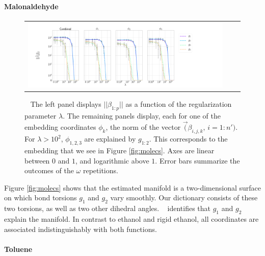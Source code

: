 {\paragraph{Malonaldehyde}\label{sec:malonaldehyde}

\begin{figure}[H]
\setlength{\picwi}{0.3\llw}
\begin{tabular}{ccc}
\includegraphics[width=4\picwi,height=1.5\picwi]{../Figures/malonaldehyde/June_27_2019_17_24_21/betassymlogsymlogbeta_paths_n50000nsel50nreps5.png}
\end{tabular}
\caption{\maldata~ The left panel displays $||\beta_{1:p}||$ as a function of the regularization parameter $\lambda$. The remaining panels display, each for one of the embedding coordinates $\phi_k$, the norm of the vector $\vec(\beta_{i,j,k},\,i=1:n')$. For $\lambda > 10^2$, $\phi_{1,2,3}$ are explained by $g_{1:2}$. This corresponds to the embedding that we see in Figure \ref{fig:molecs}. Axes are linear between $0$ and $1$, and logarithmic above $1$. Error bars summarize the outcomes of the $\omega$ repetitions.
\label{fig:mds-malonaldehydel} }
\end{figure}


Figure \ref{fig:molecs} shows that the estimated manifold is a two-dimensional surface on which bond torsions $g_1$ and $g_2$ vary smoothly. Our dictionary consists of these two torsions, as well as two other dihedral angles. \ouralg~ identifies that $g_1$ and $g_2$ explain the manifold. In contrast to ethanol and rigid ethanol, all coordinates are associated indistinguishably with both functions.


\paragraph{Toluene}\label{sec:toluene}

}
